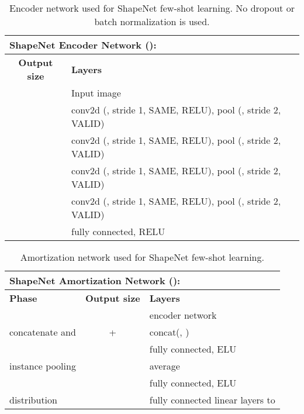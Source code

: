 \documentclass{article}
\begin{document}
\begin{table}[!h]
    \caption{Encoder network used for ShapeNet few-shot learning. No dropout or batch normalization is used.}
	\centering
	\begin{tabular}{cl}
		\multicolumn{2}{l}{\textbf{ShapeNet Encoder Network ():} } \\
		\toprule
		\textbf{Output size} & \textbf{Layers} \\
        \midrule
		 & Input image \\
		 & conv2d (, stride 1, SAME, RELU), pool (, stride 2, VALID) \\
		 & conv2d (, stride 1, SAME, RELU), pool (, stride 2, VALID) \\
		 & conv2d (, stride 1, SAME, RELU), pool (, stride 2, VALID) \\
		 & conv2d (, stride 1, SAME, RELU), pool (, stride 2, VALID) \\
         & fully connected, RELU \\
        \bottomrule
	\end{tabular}
    \vspace{2mm}
	\label{table:feature_extraction_shapenet}
\end{table}
\begin{table}[!h]
    \caption{Amortization network used for ShapeNet few-shot learning.}
	\centering
	\begin{tabular}{lcl}
	  \multicolumn{3}{l}{\textbf{ShapeNet Amortization Network ():} } \\
      \toprule
      \textbf{Phase} & \textbf{Output size} & \textbf{Layers} \\
      \midrule
       &  & encoder network  \\
      concatenate  and  &  +  & concat(, ) \\
	   &  &  fully connected, ELU \\
      instance pooling &  & average \\
       &  &  fully connected, ELU \\
       distribution &  & fully connected linear layers to  \\
      \bottomrule
	\end{tabular}
    \vspace{2mm}
	\label{table:amortization_network_shapenet}
\end{table}
\end{document}
